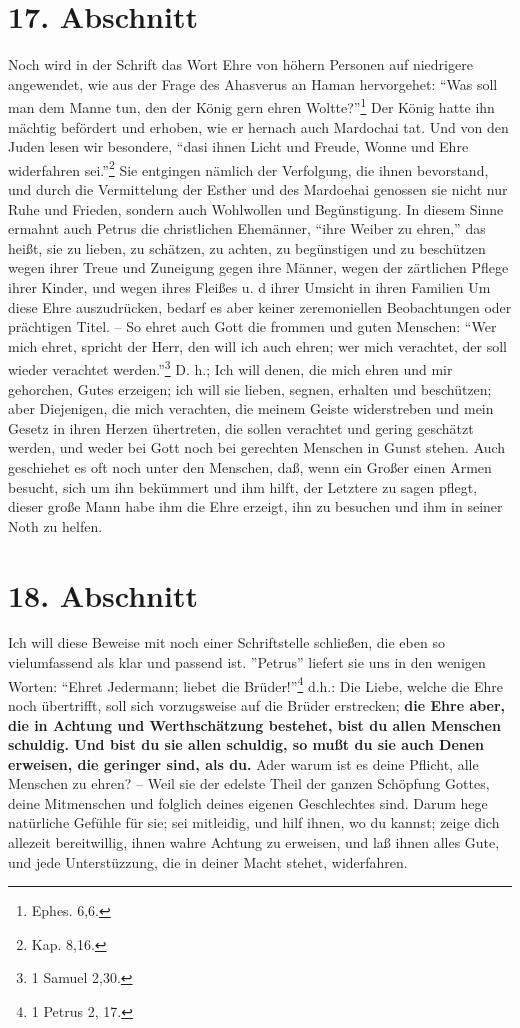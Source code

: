 \section{17. Abschnitt} \label{kap9_ab17}

Noch wird in der Schrift das Wort Ehre von höhern Personen auf niedrigere
angewendet, wie aus der Frage des Ahasverus an Haman hervorgehet: "`Was soll man
dem Manne tun, den der König gern ehren Woltte?"'\footnote{Ephes. 6,6.} Der
König hatte ihn mächtig befördert und erhoben, wie er hernach auch Mardochai
tat. Und von den Juden lesen wir besondere, "`dasi ihnen Licht und Freude,
Wonne und Ehre widerfahren sei."'\footnote{Kap. 8,16.} Sie entgingen nämlich der
Verfolgung, die ihnen bevorstand, und durch die Vermittelung der Esther und des
Mardoehai genossen sie nicht nur Ruhe und Frieden, sondern auch Wohlwollen und
Begünstigung. In diesem Sinne ermahnt auch Petrus die christlichen Ehemänner,
"`ihre Weiber zu ehren,"' das heißt, sie zu lieben, zu schätzen, zu achten, zu
begünstigen und zu beschützen wegen ihrer Treue und Zuneigung gegen ihre Männer,
wegen der zärtlichen Pflege ihrer Kinder, und wegen ihres Fleißes u. d ihrer
Umsicht in ihren Familien Um diese Ehre auszudrücken, bedarf es aber keiner
zeremoniellen Beobachtungen oder prächtigen Titel. -- So ehret auch Gott die
frommen und guten Menschen: "`Wer mich ehret, spricht der Herr, den will ich
auch ehren; wer mich verachtet, der soll wieder verachtet werden."'\footnote{1
Samuel 2,30.} D. h.; Ich will denen, die mich ehren und mir gehorchen, Gutes
erzeigen; ich will sie lieben, segnen, erhalten und beschützen; aber Diejenigen,
die mich verachten, die meinem Geiste widerstreben und mein Gesetz in ihren
Herzen ühertreten, die sollen verachtet und gering geschätzt werden, und weder
bei Gott noch bei gerechten Menschen in Gunst stehen. Auch geschiehet es oft
noch unter den Menschen, daß, wenn ein Großer einen Armen besucht, sich um ihn
bekümmert und ihm hilft, der Letztere zu sagen pflegt, dieser große Mann habe
ihm die Ehre erzeigt, ihn zu besuchen und ihm in seiner Noth zu helfen.

\section{18. Abschnitt} \label{kap9_ab18}

Ich will diese Beweise mit noch einer Schriftstelle schließen, die eben so
vielumfassend als klar und passend ist. ''Petrus'' liefert sie uns in den
wenigen Worten: "`Ehret Jedermann; liebet die Brüder!"'\footnote{1 Petrus 2, 17.}
d.h.: Die Liebe, welche die Ehre noch übertrifft, soll sich vorzugsweise auf die
Brüder erstrecken; \textbf{die Ehre aber, die in Achtung und Werthschätzung bestehet,
bist du allen Menschen schuldig. Und bist du sie allen schuldig, so mußt du sie
auch Denen erweisen, die geringer sind, als du.} Ader warum ist es deine Pflicht,
alle Menschen zu ehren? -- Weil sie der edelste Theil der ganzen Schöpfung
Gottes, deine Mitmenschen und folglich deines eigenen Geschlechtes sind. Darum
hege natürliche Gefühle für sie; sei mitleidig, und hilf ihnen, wo du kannst;
zeige dich allezeit bereitwillig, ihnen wahre Achtung zu erweisen, und laß ihnen
alles Gute, und jede Unterstüzzung, die in deiner Macht stehet, widerfahren.

